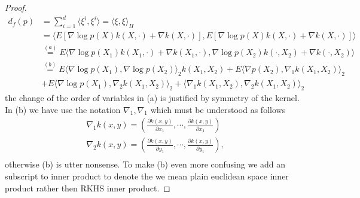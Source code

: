 \documentclass{article}
\begin{document}
\begin{proof}
 \begin{align*}
d_{f}(p) & =\sum_{i=1}^d \langle \xi^i, \xi^i \rangle = \langle \xi, \xi \rangle_{H} \\
& = \langle E \left[\nabla \log p(X) k(X,\cdot)+\nabla k(X,\cdot)\right] ,E \left[\nabla \log p(X) k(X,\cdot)+\nabla k(X,\cdot)\right] \rangle \\
& \overset{(a)}{=} E \langle   \nabla \log p(X_1) k(X_1,\cdot) + \nabla k(X_1,\cdot) , \nabla \log p(X_2) k(\cdot,X_2) + \nabla k(\cdot,X_2) \rangle \\
& \overset{(b)}{=} E\langle \nabla \log p(X_1) , \nabla\log p(X_2) \rangle_{2} k(X_1,X_2) + E \langle \nabla p(X_2),  \nabla_1 k(X_1,X_2) \rangle_{2} \\
  &+  E \langle \nabla  \log p(X_1), \nabla_{2}  k(X_1,X_2) \rangle_{2} +  \langle  \nabla_1 k(X_1,X_2), \nabla_2 k(X_1,X_2) \rangle_{2}
\end{align*}
the change of the order of  variables in (a) is justified by symmetry of the kernel. In (b) we have use the notation $\nabla_1,\nabla_1$ which must be understood as follows 
\begin{align*}
 \nabla_1 k(x,y) = \left( \frac{\partial k(x,y) }{\partial x_1}, \cdots, \frac{\partial k(x,y) }{\partial x_1} \right) \\
 \nabla_2 k(x,y) = \left( \frac{\partial k(x,y) }{\partial y_1}, \cdots, \frac{\partial k(x,y) }{\partial y_1} \right), \\ 
\end{align*}
otherwise (b) is utter nonsense. To make (b) even more confusing we add an subscript to inner product to denote the we mean plain euclidean space inner product rather then RKHS inner product.  


\end{proof}
\end{document}
